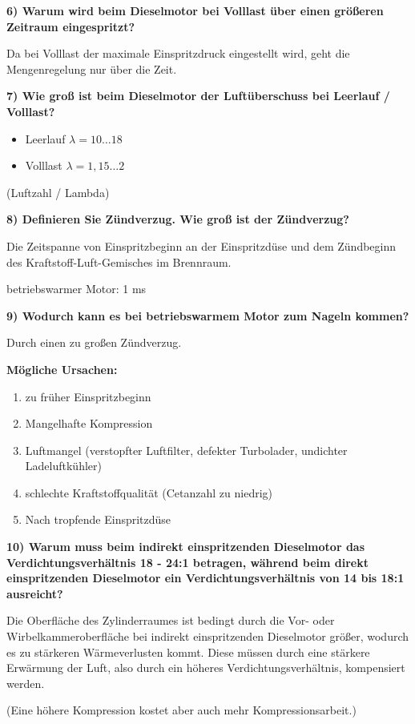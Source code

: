 \textbf{6) Warum wird beim Dieselmotor bei Volllast über einen größeren
Zeitraum eingespritzt?}

Da bei Volllast der maximale Einspritzdruck eingestellt wird, geht die
Mengenregelung nur über die Zeit.

\textbf{7) Wie groß ist beim Dieselmotor der Luftüberschuss bei Leerlauf
/ Volllast?}

\begin{itemize}
\item
  Leerlauf $\lambda = 10 \dots 18$
\item
  Volllast $\lambda = 1,15 \dots 2$
\end{itemize}

(Luftzahl / Lambda)

\textbf{8) Definieren Sie Zündverzug. Wie groß ist der Zündverzug?}

Die Zeitspanne von Einspritzbeginn an der Einspritzdüse und dem
Zündbeginn des Kraftstoff-Luft-Gemisches im Brennraum.

betriebswarmer Motor: 1 ms

\textbf{9) Wodurch kann es bei betriebswarmem Motor zum Nageln kommen?}

Durch einen zu großen Zündverzug.

\textbf{Mögliche Ursachen:}

\begin{enumerate}
\item
  zu früher Einspritzbeginn
\item
  Mangelhafte Kompression
\item
  Luftmangel (verstopfter Luftfilter, defekter Turbolader, undichter
  Ladeluftkühler)
\item
  schlechte Kraftstoffqualität (Cetanzahl zu niedrig)
\item
  Nach tropfende Einspritzdüse
\end{enumerate}

\textbf{10) Warum muss beim indirekt einspritzenden Dieselmotor das
Verdichtungsverhältnis 18 - 24:1 betragen, während beim direkt
einspritzenden Dieselmotor ein Verdichtungsverhältnis von 14 bis 18:1
ausreicht?}

Die Oberfläche des Zylinderraumes ist bedingt durch die Vor- oder
Wirbelkammeroberfläche bei indirekt einspritzenden Dieselmotor größer,
wodurch es zu stärkeren Wärmeverlusten kommt. Diese müssen durch eine
stärkere Erwärmung der Luft, also durch ein höheres
Verdichtungsverhältnis, kompensiert werden.

(Eine höhere Kompression kostet aber auch mehr Kompressionsarbeit.)
